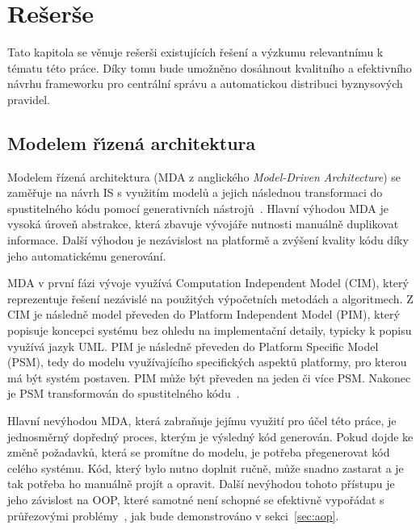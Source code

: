 
\chapter{Rešerše}\label{ch:reserse}

Tato kapitola se věnuje rešerši existujících řešení
a výzkumu relevantnímu k tématu této práce. Díky tomu bude umožněno
dosáhnout kvalitního a efektivního návrhu frameworku pro centrální správu a automatickou
distribuci byznysových pravidel.

\section{Modelem ř\'{\i}zená architektura}

Modelem řízená architektura (\gls{MDA} z anglického \textit{Model-Driven
Architecture}) se zaměřuje na návrh \gls{IS} s využitím modelů a jejich
následnou transformaci do spustitelného kódu pomocí generativních nástrojů~\cite{soley2000model}.
Hlavní výhodou \gls{MDA} je vysoká úroveň abstrakce, která zbavuje vývojáře nutnosti
manuálně duplikovat informace. Další výhodou je nezávislost na platformě a zvýšení
kvality kódu díky jeho automatickému generování.

\gls{MDA} v první fázi vývoje využívá Computation Independent Model (\gls{CIM}), který reprezentuje
řešení nezávislé na použitých výpočetních metodách a algoritmech. Z \gls{CIM} je
následně model převeden do Platform Independent Model (\gls{PIM}),
který popisuje koncepci systému bez ohledu na implementační detaily, typicky k popisu
využívá jazyk \gls{UML}. \gls{PIM} je následně převeden do
Platform Specific Model (\gls{PSM}), tedy do modelu využívajícího
specifických aspektů platformy, pro kterou má být systém postaven.
\gls{PIM} může být převeden na jeden či více \gls{PSM}.
Nakonec je \gls{PSM} transformován do spustitelného kódu~\cite{kleppe2003model}.

Hlavní nevýhodou \gls{MDA}, která zabraňuje jejímu využití
pro účel této práce, je jednosměrný dopředný proces, kterým je výsledný kód generován.
Pokud dojde ke změně požadavků, která se promítne do modelu, je potřeba přegenerovat
kód celého systému. Kód, který bylo nutno doplnit ručně, může snadno zastarat a je tak
potřeba ho manuálně projít a opravit.
Další nevýhodou tohoto přístupu je jeho závislost na \gls{OOP},
které samotné není schopné se efektivně vypořádat s průřezovými
problémy~\cite{kennard2009separation}\cite{cemus2014aspect},
jak bude demonstrováno v sekci~\ref{sec:aop}.


